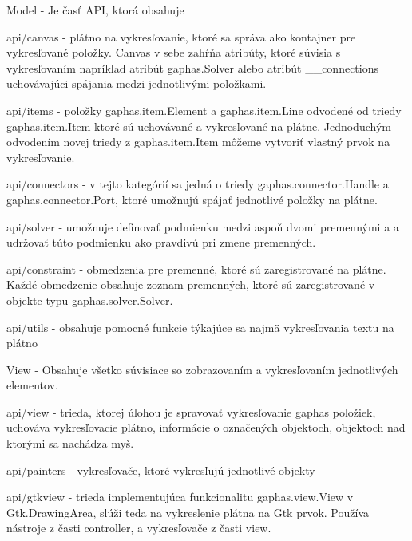 \documentclass[11pt,oneside,final]{fithesis2}
\begin{document}
\begin{list}{•}{}

\item Model - Je časť API, ktorá obsahuje 

    \begin{list}{•}{}
    	\item api/canvas - plátno na vykresľovanie, ktoré sa správa ako kontajner pre vykresľované položky. Canvas v sebe zahŕňa atribúty, ktoré súvisia s vykresľovaním napríklad atribút gaphas.Solver alebo atribút \_\_connections uchovávajúci spájania medzi jednotlivými položkami.
    	\item api/items - položky gaphas.item.Element a gaphas.item.Line odvodené od triedy gaphas.item.Item ktoré sú uchovávané a vykresľované na plátne.
    	Jednoduchým odvodením novej triedy z gaphas.item.Item môžeme vytvoriť vlastný prvok na vykresľovanie.
    	\item api/connectors - v tejto kategórií sa jedná o triedy gaphas.connector.Handle a gaphas.connector.Port, ktoré umožnujú spájať jednotlivé položky na plátne.
    	\item api/solver - umožnuje definovať podmienku medzi aspoň dvomi premennými a a udržovať túto podmienku ako pravdivú pri zmene premenných.
 		\item api/constraint - obmedzenia pre premenné, ktoré sú zaregistrované na plátne. Každé obmedzenie obsahuje zoznam premenných, ktoré sú zaregistrované v objekte typu gaphas.solver.Solver. 
 		\item api/utils - obsahuje pomocné funkcie týkajúce sa najmä vykresľovania textu na plátno
    \end{list}


\item View - Obsahuje všetko súvisiace so zobrazovaním a vykresľovaním jednotlivých elementov. 
    \begin{list}{•}{}
    \item api/view - trieda, ktorej úlohou je spravovať vykresľovanie gaphas položiek, uchováva vykresľovacie plátno, informácie o označených objektoch, objektoch nad ktorými sa nachádza myš.
    \item api/painters - vykresľovače, ktoré vykresľujú jednotlivé objekty
    \item api/gtkview - trieda implementujúca funkcionalitu gaphas.view.View v Gtk.DrawingArea, slúži teda na vykreslenie plátna na Gtk prvok. Používa nástroje z časti controller, a vykresľovače z časti view.
    \end{list}



\end{list}
\end{document}
